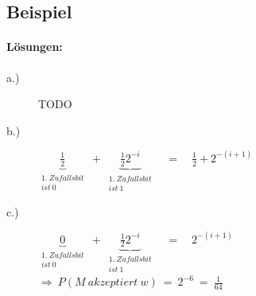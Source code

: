\subsection{Beispiel}


\paragraph{Lösungen:}
\begin{description}
	\item [a.)] TODO
	\item [b.)] $\underbrace{\frac{1}{2}}_{\substack{1.\ Zufallsbit \\ ist\ 0}}\ +\ \underbrace{\frac{1}{2}2^{-i}}_{\substack{1.\ Zufallsbit \\ ist\ 1}} \quad = \quad \frac{1}{2} + 2^{-(i+1)}$
	\item [c.)] $\underbrace{0}_{\substack{1.\ Zufallsbit \\ ist\ 0}}\ +\ \underbrace{\frac{1}{2}2^{-i}}_{\substack{1.\ Zufallsbit \\ ist\ 1}} \quad = \quad 2^{-(i+1)}$ \\ $\Rightarrow\ P(M\ akzeptiert\ w)\ =\ 2^{-6}\ =\ \frac{1}{64}$
\end{description}

